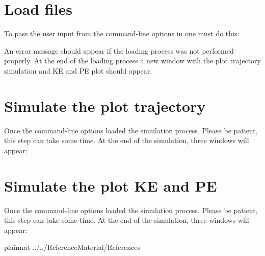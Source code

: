 \documentclass[12pt, titlepage]{article}
\begin{document}
\section{Load files}

To pass the user input from the command-line options in \progname{} 
one must do this:

An error message should appear if the loading process was not 
performed properly. At the end of the loading process a new window with the 
plot trajectory simulation and KE and PE plot should appear.




\section{Simulate the plot trajectory}

Once the command-line options loaded the simulation process. 
Please be patient, this step can take some time. 
At the end of the simulation, three windows will appear:


\section{Simulate the plot KE and PE}

Once the command-line options loaded the simulation process. 
Please be patient, this step can take some time. 
At the end of the simulation, three windows will appear:


 {plainnat}
 {../../ReferenceMaterial/References}
\end{document}
